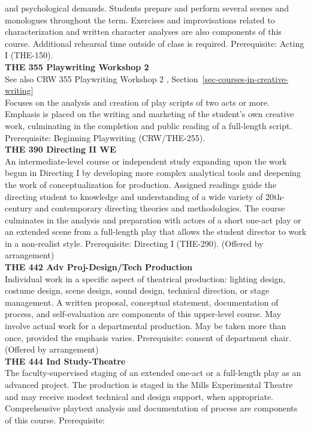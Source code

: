 \documentclass[
  letterpaper,
]{scrbook}
\begin{document}
and psychological demands. Students prepare and perform several scenes
and monologues throughout the term. Exercises and improvisations related
to characterization and written character analyses are also components
of this course. Additional rehearsal time outside of class is required.
Prerequisite: Acting I (THE-150).\\
\textbf{THE 355 Playwriting Workshop 2}\\
See also CRW 355 Playwriting Workshop 2 ,
Section~\ref{sec-courses-in-creative-writing}\\
Focuses on the analysis and creation of play scripts of two acts or
more. Emphasis is placed on the writing and marketing of the student's
own creative work, culminating in the completion and public reading of a
full-length script. Prerequisite: Beginning Playwriting (CRW/THE-255).\\
\textbf{THE 390 Directing II WE}\\
An intermediate-level course or independent study expanding upon the
work begun in Directing I by developing more complex analytical tools
and deepening the work of conceptualization for production. Assigned
readings guide the directing student to knowledge and understanding of a
wide variety of 20th-century and contemporary directing theories and
methodologies. The course culminates in the analysis and preparation
with actors of a short one-act play or an extended scene from a
full-length play that allows the student director to work in a
non-realist style. Prerequisite: Directing I (THE-290). (Offered by
arrangement)\\
\textbf{THE 442 Adv Proj-Design/Tech Production}\\
Individual work in a specific aspect of theatrical production: lighting
design, costume design, scene design, sound design, technical direction,
or stage management. A written proposal, conceptual statement,
documentation of process, and self-evaluation are components of this
upper-level course. May involve actual work for a departmental
production. May be taken more than once, provided the emphasis varies.
Prerequisite: consent of department chair. (Offered by arrangement)\\
\textbf{THE 444 Ind Study-Theatre}\\
The faculty-supervised staging of an extended one-act or a full-length
play as an advanced project. The production is staged in the Mills
Experimental Theatre and may receive modest technical and design
support, when appropriate. Comprehensive playtext analysis and
documentation of process are components of this course. Prerequisite:
\end{document}
